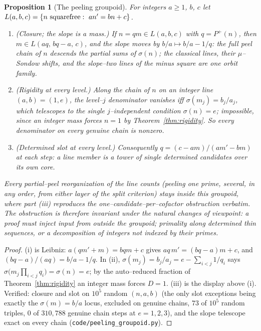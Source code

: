 \documentclass[11pt]{article}
\newtheorem{proposition}[theorem]{Proposition}
\theoremstyle{definition}
\begin{document}
\begin{proposition}[The peeling groupoid]\label{prop:groupoid}
For integers $a\ge1$, $b$, $c$ let $L(a,b,c)=\{n\ \textnormal{squarefree}:\ an'=bn+c\}$.
\begin{enumerate}[label=\textup{(\roman*)},leftmargin=2.2em]
\item \emph{(Closure; the slope is a mass.)} If $n=qm\in L(a,b,c)$ with $q=P^+(n)$, then
$m\in L(aq,\,bq-a,\,c)$, and the slope moves by $b/a\mapsto b/a-1/q$: the full peel chain of $n$
descends the partial sums of $\sigma(n)$; the classical lines, their $\mu$--Sondow shifts, and
the slope--two lines of the minus square are one orbit family.
\item \emph{(Rigidity at every level.)} Along the chain of $n$ on an integer line $(a,b)=(1,e)$,
the level--$j$ denominator vanishes iff $\sigma(m_j)=b_j/a_j$, which telescopes to the single
$j$--independent condition $\sigma(n)=e$; impossible, since an integer mass forces $n=1$ by
Theorem~\ref{thm:rigidity}. So every denominator on every genuine chain is nonzero.
\item \emph{(Determined slot at every level.)} Consequently $q=(c-am)/(am'-bm)$ at each step:
a line member is a tower of single determined candidates over its own core.
\end{enumerate}
Every partial--peel reorganization of the line counts (peeling one prime, several, in any
order, from either layer of the split criterion) stays inside this groupoid, where part
\textup{(iii)} reproduces the one--candidate--per--cofactor obstruction verbatim. The obstruction
is therefore \emph{invariant} under the natural changes of viewpoint: a proof must inject input
from outside the groupoid; primality along determined thin sequences, or a decomposition of
integers not indexed by their primes.
\end{proposition}
\begin{proof}
(i) is Leibniz: $a(qm'+m)=bqm+c$ gives $aq\,m'=(bq-a)m+c$, and $(bq-a)/(aq)=b/a-1/q$. In (ii),
$\sigma(m_j)=b_j/a_j=e-\sum_{i<j}1/q_i$ says $\sigma\bigl(m_j\prod_{i<j}q_i\bigr)=\sigma(n)=e$;
by the auto--reduced fraction of Theorem~\ref{thm:rigidity} an integer mass forces $D=1$. (iii) is
the display above (i). Verified: closure and slot on $10^5$ random $(n,a,b)$ (the only slot
exceptions being exactly the $\sigma(m)=b/a$ locus, excluded on genuine chains, $73$ of $10^5$
random triples, $0$ of $310{,}788$ genuine chain steps at $e=1,2,3$), and the slope telescope
exact on every chain (\texttt{code/peeling\_groupoid.py}).
\end{proof}
\end{document}
